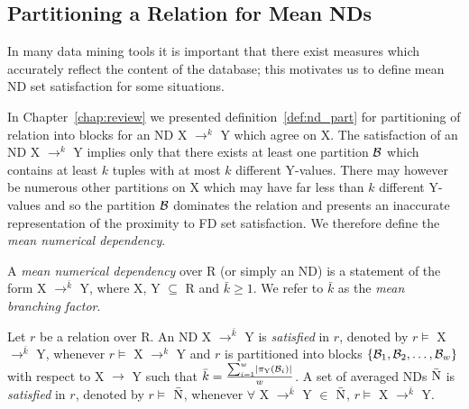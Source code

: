 \subsection{Partitioning a Relation for Mean NDs}\label{nd:subsec:mean}

In many data mining tools it is important that there exist measures
which accurately reflect the content of the database; this motivates
us to define mean ND set satisfaction for some situations.

\smallskip

In Chapter~\ref{chap:review} we presented definition~\ref{def:nd_part}
for partitioning of relation into blocks for an ND X $\to^k$ Y which
agree on X.
The satisfaction of an ND X $\to^k$ Y implies only that there exists
at least one partition ${\cal B}$ which contains at least $k$ tuples
with at most $k$ different Y-values.  There may however be numerous
other partitions on X which may have far less than $k$ different
Y-values and so the partition ${\cal B}$ dominates the relation and
presents an inaccurate representation of the proximity to FD set
satisfaction.  We therefore define the {\em mean numerical dependency}.


\begin{definition}
\begin{rm}
A {\em mean numerical dependency} over R (or simply an ND)
is a statement of the form X $\to^{\bar{k}}$ Y, where X, Y $\subseteq$ R and
$\bar{k} \ge 1$. We refer to $\bar{k}$ as the {\em mean branching factor}.
\end{rm}
\end{definition}
 
\begin{definition}\label{def:sat-mean_nd}
\begin{rm}
Let $r$ be a relation over R.
An ND X $\to^{\bar{k}}$ Y is {\em satisfied} in $r$,
denoted by $r \models$ X $\to^{\bar{k}}$ Y, whenever
$r \models$ X $\to^k$ Y and $r$ is partitioned into blocks
$\{{\cal B}_1, {\cal B}_2, \ldots, {\cal B}_w\}$ with respect to X
$\to$ Y such that $\bar{k} = \frac{\sum_{i = 1}^{w} \mid
\pi_{\rm Y}({\cal B}_{i}) \mid }{w}$.
A set of averaged NDs $\bar{\rm N}$ is {\em satisfied} in $r$,
denoted by $r \models$ $\bar{\rm N}$, whenever
$\forall$ X $\to^{\bar{k}}$ Y $\in$ $\bar{\rm N}$, $r \models$ X $\to^{\bar{k}}$ Y.
\end{rm}
\end{definition}



